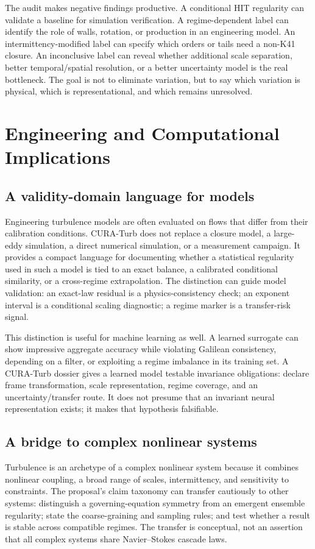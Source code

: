 \documentclass[conference]{../../../../Conference-LaTeX-template_10-17-19/IEEEtran}
\begin{document}
The audit makes negative findings productive. A conditional HIT regularity can validate a baseline for simulation verification. A regime-dependent label can identify the role of walls, rotation, or production in an engineering model. An intermittency-modified label can specify which orders or tails need a non-K41 closure. An inconclusive label can reveal whether additional scale separation, better temporal/spatial resolution, or a better uncertainty model is the real bottleneck. The goal is not to eliminate variation, but to say which variation is physical, which is representational, and which remains unresolved.

\section{Engineering and Computational Implications}
\subsection{A validity-domain language for models}
Engineering turbulence models are often evaluated on flows that differ from their calibration conditions. CURA-Turb does not replace a closure model, a large-eddy simulation, a direct numerical simulation, or a measurement campaign. It provides a compact language for documenting whether a statistical regularity used in such a model is tied to an exact balance, a calibrated conditional similarity, or a cross-regime extrapolation. The distinction can guide model validation: an exact-law residual is a physics-consistency check; an exponent interval is a conditional scaling diagnostic; a regime marker is a transfer-risk signal.

This distinction is useful for machine learning as well. A learned surrogate can show impressive aggregate accuracy while violating Galilean consistency, depending on a filter, or exploiting a regime imbalance in its training set. A CURA-Turb dossier gives a learned model testable invariance obligations: declare frame transformation, scale representation, regime coverage, and an uncertainty/transfer route. It does not presume that an invariant neural representation exists; it makes that hypothesis falsifiable.

\subsection{A bridge to complex nonlinear systems}
Turbulence is an archetype of a complex nonlinear system because it combines nonlinear coupling, a broad range of scales, intermittency, and sensitivity to constraints. The proposal's claim taxonomy can transfer cautiously to other systems: distinguish a governing-equation symmetry from an emergent ensemble regularity; state the coarse-graining and sampling rules; and test whether a result is stable across compatible regimes. The transfer is conceptual, not an assertion that all complex systems share Navier--Stokes cascade laws.
\end{document}
